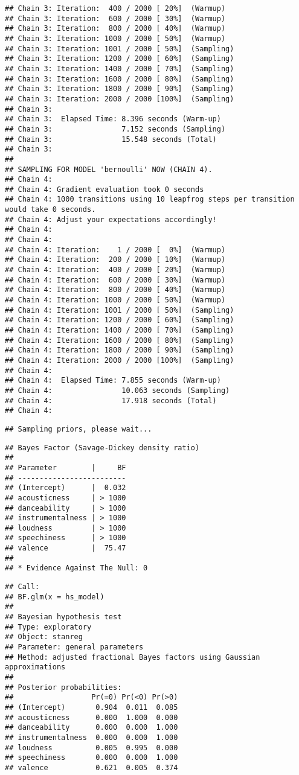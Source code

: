 \documentclass[
]{article}
\begin{document}
\begin{verbatim}
## Chain 3: Iteration:  400 / 2000 [ 20%]  (Warmup)
## Chain 3: Iteration:  600 / 2000 [ 30%]  (Warmup)
## Chain 3: Iteration:  800 / 2000 [ 40%]  (Warmup)
## Chain 3: Iteration: 1000 / 2000 [ 50%]  (Warmup)
## Chain 3: Iteration: 1001 / 2000 [ 50%]  (Sampling)
## Chain 3: Iteration: 1200 / 2000 [ 60%]  (Sampling)
## Chain 3: Iteration: 1400 / 2000 [ 70%]  (Sampling)
## Chain 3: Iteration: 1600 / 2000 [ 80%]  (Sampling)
## Chain 3: Iteration: 1800 / 2000 [ 90%]  (Sampling)
## Chain 3: Iteration: 2000 / 2000 [100%]  (Sampling)
## Chain 3: 
## Chain 3:  Elapsed Time: 8.396 seconds (Warm-up)
## Chain 3:                7.152 seconds (Sampling)
## Chain 3:                15.548 seconds (Total)
## Chain 3: 
## 
## SAMPLING FOR MODEL 'bernoulli' NOW (CHAIN 4).
## Chain 4: 
## Chain 4: Gradient evaluation took 0 seconds
## Chain 4: 1000 transitions using 10 leapfrog steps per transition would take 0 seconds.
## Chain 4: Adjust your expectations accordingly!
## Chain 4: 
## Chain 4: 
## Chain 4: Iteration:    1 / 2000 [  0%]  (Warmup)
## Chain 4: Iteration:  200 / 2000 [ 10%]  (Warmup)
## Chain 4: Iteration:  400 / 2000 [ 20%]  (Warmup)
## Chain 4: Iteration:  600 / 2000 [ 30%]  (Warmup)
## Chain 4: Iteration:  800 / 2000 [ 40%]  (Warmup)
## Chain 4: Iteration: 1000 / 2000 [ 50%]  (Warmup)
## Chain 4: Iteration: 1001 / 2000 [ 50%]  (Sampling)
## Chain 4: Iteration: 1200 / 2000 [ 60%]  (Sampling)
## Chain 4: Iteration: 1400 / 2000 [ 70%]  (Sampling)
## Chain 4: Iteration: 1600 / 2000 [ 80%]  (Sampling)
## Chain 4: Iteration: 1800 / 2000 [ 90%]  (Sampling)
## Chain 4: Iteration: 2000 / 2000 [100%]  (Sampling)
## Chain 4: 
## Chain 4:  Elapsed Time: 7.855 seconds (Warm-up)
## Chain 4:                10.063 seconds (Sampling)
## Chain 4:                17.918 seconds (Total)
## Chain 4:
\end{verbatim}

\begin{verbatim}
## Sampling priors, please wait...
\end{verbatim}

\begin{verbatim}
## Bayes Factor (Savage-Dickey density ratio)
## 
## Parameter        |     BF
## -------------------------
## (Intercept)      |  0.032
## acousticness     | > 1000
## danceability     | > 1000
## instrumentalness | > 1000
## loudness         | > 1000
## speechiness      | > 1000
## valence          |  75.47
## 
## * Evidence Against The Null: 0
\end{verbatim}

\begin{verbatim}
## Call:
## BF.glm(x = hs_model)
## 
## Bayesian hypothesis test
## Type: exploratory
## Object: stanreg
## Parameter: general parameters
## Method: adjusted fractional Bayes factors using Gaussian approximations
## 
## Posterior probabilities:
##                  Pr(=0) Pr(<0) Pr(>0)
## (Intercept)       0.904  0.011  0.085
## acousticness      0.000  1.000  0.000
## danceability      0.000  0.000  1.000
## instrumentalness  0.000  0.000  1.000
## loudness          0.005  0.995  0.000
## speechiness       0.000  0.000  1.000
## valence           0.621  0.005  0.374
\end{verbatim}
\end{document}
